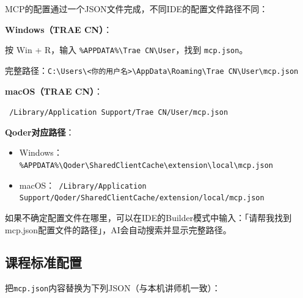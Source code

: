 MCP的配置通过一个JSON文件完成，不同IDE的配置文件路径不同：

\textbf{Windows（TRAE CN）}：

按 Win + R，输入 \texttt{\%APPDATA\%\textbackslash Trae CN\textbackslash User}，找到 \texttt{mcp.json}。

完整路径：\texttt{C:\textbackslash Users\textbackslash <你的用户名>\textbackslash AppData\textbackslash Roaming\textbackslash Trae CN\textbackslash User\textbackslash mcp.json}

\textbf{macOS（TRAE CN）}：

\texttt{~/Library/Application Support/Trae CN/User/mcp.json}

\textbf{Qoder对应路径}：

\begin{itemize}[leftmargin=2em]
  \item Windows：\texttt{\%APPDATA\%\textbackslash Qoder\textbackslash SharedClientCache\textbackslash extension\textbackslash local\textbackslash mcp.json}
  \item macOS：\texttt{~/Library/Application Support/Qoder/SharedClientCache/extension/local/mcp.json}
\end{itemize}

\begin{practicebox}[快速定位技巧]
如果不确定配置文件在哪里，可以在IDE的Builder模式中输入：「请帮我找到mcp.json配置文件的路径」，AI会自动搜索并显示完整路径。
\end{practicebox}

\subsection{课程标准配置}

把\texttt{mcp.json}内容替换为下列JSON（与本机讲师机一致）：

